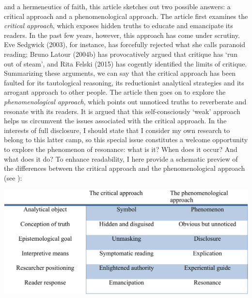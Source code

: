 \begin{adjmulticols}{2}{0mm}{0mm}
and a hermeneutics of faith, this article sketches out two possible answers: a critical approach and a phenomenological approach. The article first examines the \textit{critical approach}, which exposes hidden truths to educate and emancipate its readers. In the past few years, however, this approach has come under scrutiny. Eve Sedgwick (2003), for instance, has forcefully rejected what she calls paranoid reading; Bruno Latour (2004b) has provocatively argued that critique has ‘run out of steam’, and Rita Felski (2015) has cogently identified the limits of critique. Summarizing these arguments, we can say that the critical approach has been faulted for its tautological reasoning, its reductionist analytical strategies and its arrogant approach to other people. The article then goes on to explore the \textit{phenomenological approach}, which points out unnoticed truths to reverberate and resonate with its readers. It is argued that this self-consciously ‘weak’ approach helps us circumvent the issues associated with the critical approach. In the interests of full disclosure, I should state that I consider my own research to belong to this latter camp, so this special issue constitutes a welcome opportunity to explore the phenomenon of resonance: what is it? When does it occur? And what does it do? To enhance readability, I here provide a schematic preview of the differences between the critical approach and the phenomenological approach (see ):
    \end{adjmulticols}
\FloatBarrier
\noindent
\begin{table}[htb]
\centering %
\caption{} %
\includegraphics[width=0.9\linewidth]{paper4/p4_data/p4-fig1.png}
\label{tab:p4:1}
\end{table}
\FloatBarrier
